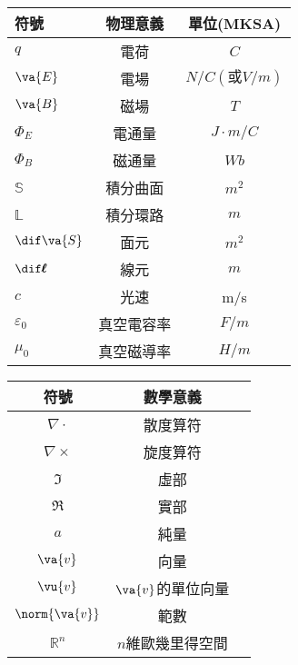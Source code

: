 \clearpage
\begin{table}[!htbp]
    \centering
    \begin{tabular}{lcc}
        \toprule
        符號              & 物理意義   & 單位(MKSA)           \\
        \midrule
        $q$               & 電荷       & $\unit{C}$           \\
        $\va{E}$          & 電場       & $\unit{N/C(或V/m)}$  \\
        $\va{B}$          & 磁場       & $\unit{T}$           \\
        $\Phi_E$          & 電通量     & $\unit{J\cdot m /C}$ \\
        $\Phi_B$          & 磁通量     & $\unit{Wb}$          \\
        $\mathbb{S}$      & 積分曲面   & $\unit{m^2}$         \\
        $\mathbb{L}$      & 積分環路   & $\unit{m}$           \\
        $\dif \va{S}$     & 面元       & $\unit{m^2}$         \\
        $\dif \pmb{\ell}$ & 線元       & $\unit{m}$           \\
        $c$               & 光速       & m/s                  \\
        $\varepsilon_0$   & 真空電容率 & $\unit{F/m}$         \\
        $\mu_0$           & 真空磁導率 & $\unit{H/m}$         \\
        \bottomrule
    \end{tabular}
\end{table}

\begin{table}[!htbp]
    \centering
    \begin{tabular}{ccc}
        \toprule
        符號            & 數學意義           \\
        \midrule
        $\nabla \cdot$  & 散度算符           \\
        $\nabla \times$ & 旋度算符           \\
        $\Im$           & 虛部               \\
        $\Re$           & 實部               \\
        $a$             & 純量               \\
        $\va{v}$        & 向量               \\
        $\vu{v}$        & $\va{v}$的單位向量 \\
        $\norm{\va{v}}$ & 範數               \\
        $\mathbb{R}^n$  & $n$維歐幾里得空間  \\
        \bottomrule
    \end{tabular}
\end{table}
